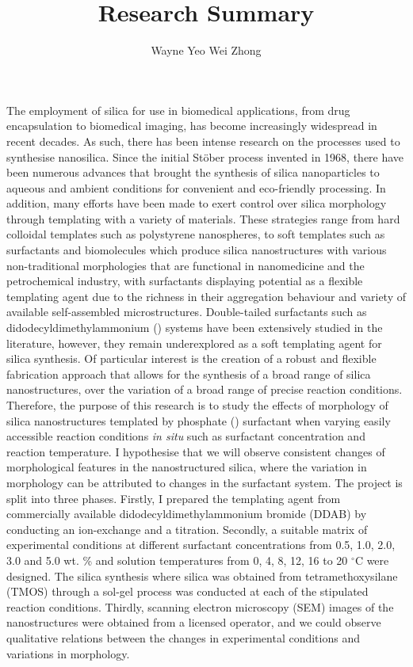 \documentclass[a4paper,12pt]{article}
\date{}
\author{Wayne Yeo Wei Zhong} %
\title{Research Summary} %
\begin{document}
	\maketitle
	
	The employment of silica for use in biomedical applications, from drug encapsulation to biomedical imaging, has become increasingly widespread in recent decades. As such, there has been intense research on the processes used to synthesise nanosilica. Since the initial St\"ober process invented in 1968, there have been numerous advances that brought the synthesis of silica nanoparticles to aqueous and ambient conditions for convenient and eco-friendly processing.
	\bigbreak
	In addition, many efforts have been made to exert control over silica morphology through templating with a variety of materials. These strategies range from hard colloidal templates such as polystyrene nanospheres, to soft templates such as surfactants and biomolecules which produce silica nanostructures with various non-traditional morphologies that are functional in nanomedicine and the petrochemical industry, with surfactants displaying potential as a flexible templating agent due to the richness in their aggregation behaviour and variety of available self-assembled microstructures.
	\bigbreak
	Double-tailed surfactants such as didodecyldimethylammonium () systems have been extensively studied in the literature, however, they remain underexplored as a soft templating agent for silica synthesis. Of particular interest is the creation of a robust and flexible fabrication approach that allows for the synthesis of a broad range of silica nanostructures, over the variation of a broad range of precise reaction conditions. Therefore, the purpose of this research is to study the effects of morphology of silica nanostructures templated by  phosphate () surfactant when varying easily accessible reaction conditions \textit{in situ} such as surfactant concentration and reaction temperature. I hypothesise that we will observe consistent changes of morphological features in the nanostructured silica, where the variation in morphology can be attributed to changes in the surfactant system.
	\bigbreak
	The project is split into three phases. Firstly, I prepared the  templating agent from commercially available didodecyldimethylammonium bromide (DDAB) by conducting an ion-exchange and a titration. Secondly, a suitable matrix of experimental conditions at different surfactant concentrations from 0.5, 1.0, 2.0, 3.0 and 5.0 wt. \% and solution temperatures from 0, 4, 8, 12, 16 to 20 $^\circ$C were designed. The silica synthesis where silica was obtained from tetramethoxysilane (TMOS) through a sol-gel process was conducted at each of the stipulated reaction conditions. Thirdly, scanning electron microscopy (SEM) images of the nanostructures were obtained from a licensed operator, and we could observe qualitative relations between the changes in experimental conditions and variations in morphology.
\end{document}
